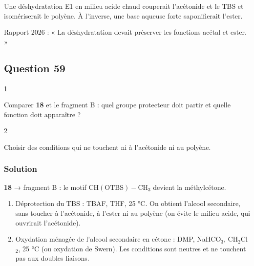 \documentclass[11pt,a4paper]{article}
\providecommand{\tightlist}{\setlength{\itemsep}{0pt}\setlength{\parskip}{0pt}}
\begin{document}
\begin{piege}

Une déshydratation E1 en milieu acide chaud couperait l'acétonide et le TBS et isomériserait le polyène. À l'inverse, une base aqueuse forte saponifierait l'ester.

\end{piege}

\begin{jury}

Rapport 2026 : « La déshydratation devait préserver les fonctions acétal et ester. »

\end{jury}

\hypertarget{question-59}{%
\subsection{Question 59}\label{question-59}}

\begin{indication}{1}

Comparer \textbf{18} et le fragment B : quel groupe protecteur doit partir et quelle fonction doit apparaître ?

\end{indication}

\begin{indication}{2}

Choisir des conditions qui ne touchent ni à l'acétonide ni au polyène.

\end{indication}

\hypertarget{solution-58}{%
\subsubsection{Solution}\label{solution-58}}

\textbf{18} → fragment B : le motif \(\mathrm{CH(OTBS){-}CH_3}\) devient la méthylcétone.

\begin{enumerate}
\def\labelenumi{\arabic{enumi}.}
\tightlist
\item
  Déprotection du TBS : TBAF, THF, 25 °C. On obtient l'alcool secondaire, sans toucher à l'acétonide, à l'ester ni au polyène (on évite le milieu acide, qui ouvrirait l'acétonide).
\item
  Oxydation ménagée de l'alcool secondaire en cétone : DMP, NaHCO\(_3\), CH\(_2\)Cl\(_2\), 25 °C (ou oxydation de Swern). Les conditions sont neutres et ne touchent pas aux doubles liaisons.
\end{enumerate}
\end{document}
